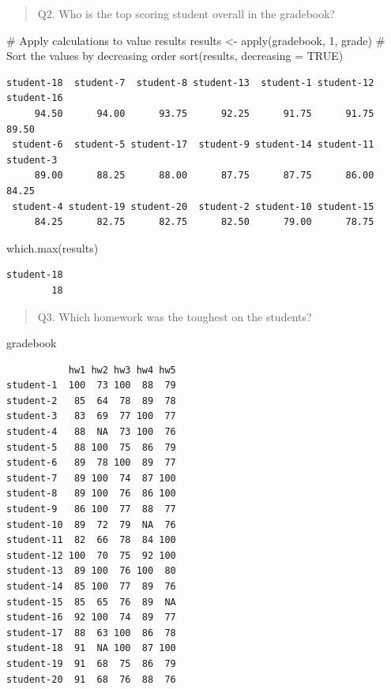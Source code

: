 \documentclass[
  letterpaper,
  DIV=11,
  numbers=noendperiod]{scrartcl}
\newenvironment{Shaded}{\begin{snugshade}}{\end{snugshade}}
\newcommand{\AttributeTok}[1]{\textcolor[rgb]{0.40,0.45,0.13}{#1}}
\newcommand{\CommentTok}[1]{\textcolor[rgb]{0.37,0.37,0.37}{#1}}
\newcommand{\ConstantTok}[1]{\textcolor[rgb]{0.56,0.35,0.01}{#1}}
\newcommand{\DecValTok}[1]{\textcolor[rgb]{0.68,0.00,0.00}{#1}}
\newcommand{\FunctionTok}[1]{\textcolor[rgb]{0.28,0.35,0.67}{#1}}
\newcommand{\NormalTok}[1]{\textcolor[rgb]{0.00,0.23,0.31}{#1}}
\newcommand{\OtherTok}[1]{\textcolor[rgb]{0.00,0.23,0.31}{#1}}
\begin{document}
\begin{quote}
Q2. Who is the top scoring student overall in the gradebook?
\end{quote}

\begin{Shaded}
\begin{Highlighting}[]
\CommentTok{\# Apply calculations to value \textquotesingle{}results\textquotesingle{}}
\NormalTok{results }\OtherTok{\textless{}{-}} \FunctionTok{apply}\NormalTok{(gradebook, }\DecValTok{1}\NormalTok{, grade)}
\CommentTok{\# Sort the values by decreasing order}
\FunctionTok{sort}\NormalTok{(results, }\AttributeTok{decreasing =} \ConstantTok{TRUE}\NormalTok{)}
\end{Highlighting}
\end{Shaded}

\begin{verbatim}
student-18  student-7  student-8 student-13  student-1 student-12 student-16 
     94.50      94.00      93.75      92.25      91.75      91.75      89.50 
 student-6  student-5 student-17  student-9 student-14 student-11  student-3 
     89.00      88.25      88.00      87.75      87.75      86.00      84.25 
 student-4 student-19 student-20  student-2 student-10 student-15 
     84.25      82.75      82.75      82.50      79.00      78.75 
\end{verbatim}

\begin{Shaded}
\begin{Highlighting}[]
\FunctionTok{which.max}\NormalTok{(results)}
\end{Highlighting}
\end{Shaded}

\begin{verbatim}
student-18 
        18 
\end{verbatim}

\begin{quote}
Q3. Which homework was the toughest on the students?
\end{quote}

\begin{Shaded}
\begin{Highlighting}[]
\NormalTok{gradebook}
\end{Highlighting}
\end{Shaded}

\begin{verbatim}
           hw1 hw2 hw3 hw4 hw5
student-1  100  73 100  88  79
student-2   85  64  78  89  78
student-3   83  69  77 100  77
student-4   88  NA  73 100  76
student-5   88 100  75  86  79
student-6   89  78 100  89  77
student-7   89 100  74  87 100
student-8   89 100  76  86 100
student-9   86 100  77  88  77
student-10  89  72  79  NA  76
student-11  82  66  78  84 100
student-12 100  70  75  92 100
student-13  89 100  76 100  80
student-14  85 100  77  89  76
student-15  85  65  76  89  NA
student-16  92 100  74  89  77
student-17  88  63 100  86  78
student-18  91  NA 100  87 100
student-19  91  68  75  86  79
student-20  91  68  76  88  76
\end{verbatim}
\end{document}
